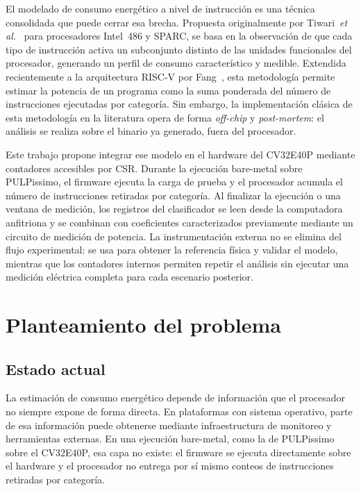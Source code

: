El modelado de consumo energético a nivel de instrucción es una técnica
consolidada que puede cerrar esa brecha. Propuesta originalmente por
Tiwari~\emph{et al.}~\cite{tiwari1994power} para procesadores Intel~486 y
SPARC, se basa en la observación de que cada tipo de instrucción activa un
subconjunto distinto de las unidades funcionales del procesador, generando
un perfil de consumo característico y medible. Extendida recientemente a la
arquitectura RISC-V por Fang~\cite{fang2021instruction}, esta metodología permite estimar la potencia de un programa
como la suma ponderada del número de instrucciones ejecutadas por categoría.
Sin embargo, la implementación clásica de esta metodología en la literatura
opera de forma \emph{off-chip} y \emph{post-mortem}: el análisis se realiza
sobre el binario ya generado, fuera del procesador.

Este trabajo propone integrar ese modelo en el hardware del CV32E40P mediante
contadores accesibles por CSR. Durante la ejecución bare-metal sobre
PULPissimo, el firmware ejecuta la carga de prueba y el procesador acumula el
número de instrucciones retiradas por categoría. Al finalizar la ejecución o una
ventana de medición, los registros del clasificador se leen desde la computadora
anfitriona y se combinan con coeficientes caracterizados previamente mediante un
circuito de medición de potencia. La instrumentación
externa no se elimina del flujo experimental: se usa para obtener la referencia
física y validar el modelo, mientras que los contadores internos permiten
repetir el análisis sin ejecutar una medición eléctrica completa para cada
escenario posterior.

\section{Planteamiento del problema}
\label{sec:planteamiento}

\subsection{Estado actual}
\label{sec:estado_actual}

La estimación de consumo energético depende de información que el procesador no
siempre expone de forma directa. En plataformas con sistema operativo, parte de
esa información puede obtenerse mediante infraestructura de monitoreo y
herramientas externas. En una ejecución bare-metal, como la de PULPissimo sobre
el CV32E40P, esa capa no existe: el firmware se ejecuta directamente sobre el
hardware y el procesador no entrega por sí mismo conteos de instrucciones
retiradas por categoría.

